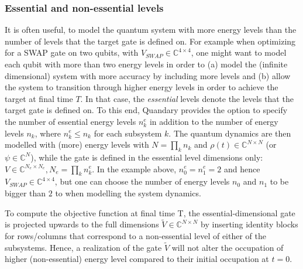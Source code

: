 \documentclass[11pt]{article}
\newcommand{\C}{\mathds{C}}
\begin{document}
\subsubsection{Essential and non-essential levels} \label{sec:essentiallevels}
It is often useful, to model the quantum system with more energy levels than the number of levels that the target gate is defined on. For example when optimizing for a SWAP gate on two qubits, with $V_{SWAP}\in\C^{4\times 4}$, one might want to model each qubit with more than two energy levels in order to (a) model the (infinite dimensional) system with more accuracy by including more levels and (b) allow the system to transition through higher energy levels in order to achieve the target at final time $T$. In that case, the \textit{essential} levels denote the levels that the target gate is defined on.
To this end, Quandary provides the option to specify the number of essential energy levels $n_k^e$ in addition to the number of energy levels $n_k$, where $n_k^e \leq n_k$ for each subsystem $k$. The quantum dynamics are then modelled with (more) energy levels with $N=\prod_k n_k$ and $\rho(t)\in \C^{N\times N}$ (or $\psi\in\C^N$), while the gate is defined in the essential level dimensions only: $V\in \C^{N_e \times N_e}, N_e=\prod_k n_k^e$. In the example above, $n^e_0=n^e_1=2$ and hence $V_{SWAP}\in \C^{4\times 4}$, but one can choose the number of energy levels $n_0$ and $n_1$ to be bigger than $2$ to when modelling the system dynamics. 
 
To compute the objective function at final time T, the essential-dimensional gate is projected upwards to the full dimensions $\tilde V \in \C^{N\times N}$ by inserting identity blocks for rows/columns that correspond to a non-essential level of either of the subsystems. Hence, a realization of the gate $\tilde V$ will not alter the occupation of higher (non-essential) energy level compared to their initial occupation at $t=0$. 

 
\end{document}
